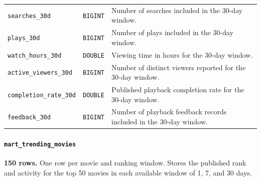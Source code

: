 \documentclass[a4paper,12pt]{article}
\newcommand{\dbsep}{\_\allowbreak}
\begin{document}
\begin{longtable}{@{}>{\raggedright\arraybackslash}p{}
                    >{\raggedright\arraybackslash}p{}
                    >{\raggedright\arraybackslash}p{}@{}}
\texttt{searches\dbsep 30d} & \texttt{BIGINT} & Number of searches included in the 30-day window.\\
\texttt{plays\dbsep 30d} & \texttt{BIGINT} & Number of plays included in the 30-day window.\\
\texttt{watch\dbsep hours\dbsep 30d} & \texttt{DOUBLE} & Viewing time in hours for the 30-day window.\\
\texttt{active\dbsep viewers\dbsep 30d} & \texttt{BIGINT} & Number of distinct viewers reported for the 30-day window.\\
\texttt{completion\dbsep rate\dbsep 30d} & \texttt{DOUBLE} & Published playback completion rate for the 30-day window.\\
\texttt{feedback\dbsep 30d} & \texttt{BIGINT} & Number of playback feedback records included in the 30-day window.\\
\end{longtable}
\endgroup

\paragraph{\texttt{mart\dbsep trending\dbsep movies}}
\textbf{150 rows.} One row per movie and ranking window.
Stores the published rank and activity for the top 50 movies in each available window of 1, 7, and 30 days.
\end{document}
